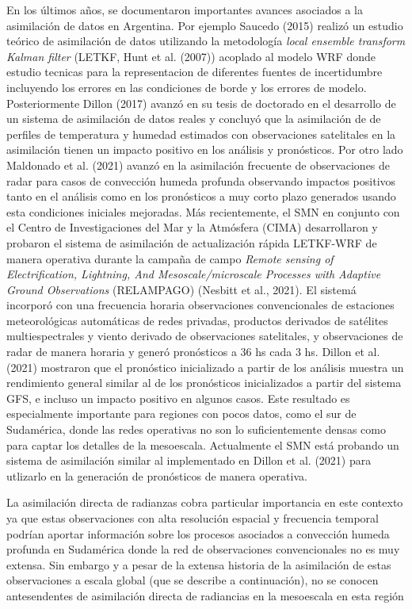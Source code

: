 \documentclass[12pt,oneside]{reedthesis}
\begin{document}
En los últimos años, se documentaron importantes avances asociados a la asimilación de datos en Argentina. Por ejemplo Saucedo (2015) realizó un estudio teórico de asimilación de datos utilizando la metodología \emph{local ensemble transform Kalman filter} (LETKF, Hunt et al. (2007)) acoplado al modelo WRF donde estudio tecnicas para la representacion de diferentes fuentes de incertidumbre incluyendo los errores en las condiciones de borde y los errores de modelo. Posteriormente Dillon (2017) avanzó en su tesis de doctorado en el desarrollo de un sistema de asimilación de datos reales y concluyó que la asimilación de de perfiles de temperatura y humedad estimados con observaciones satelitales en la asimilación tienen un impacto positivo en los análisis y pronósticos. Por otro lado Maldonado et al. (2021) avanzó en la asimilación frecuente de observaciones de radar para casos de convección humeda profunda observando impactos positivos tanto en el análisis como en los pronósticos a muy corto plazo generados usando esta condiciones iniciales mejoradas. Más recientemente, el SMN en conjunto con el Centro de Investigaciones del Mar y la Atmósfera (CIMA) desarrollaron y probaron el sistema de asimilación de actualización rápida LETKF-WRF de manera operativa durante la campaña de campo \emph{Remote sensing of Electrification, Lightning, And Mesoscale/microscale Processes with Adaptive Ground Observations} (RELAMPAGO) (Nesbitt et al., 2021). El sistemá incorporó con una frecuencia horaria observaciones convencionales de estaciones meteorológicas automáticas de redes privadas, productos derivados de satélites multiespectrales y viento derivado de observaciones satelitales, y observaciones de radar de manera horaria y generó pronósticos a 36 hs cada 3 hs. Dillon et al. (2021) mostraron que el pronóstico inicializado a partir de los análisis muestra un rendimiento general similar al de los pronósticos inicializados a partir del sistema GFS, e incluso un impacto positivo en algunos casos. Este resultado es especialmente importante para regiones con pocos datos, como el sur de Sudamérica, donde las redes operativas no son lo suficientemente densas como para captar los detalles de la mesoescala. Actualmente el SMN está probando un sistema de asimilación similar al implementado en Dillon et al. (2021) para utlizarlo en la generación de pronósticos de manera operativa.

La asimilación directa de radianzas cobra particular importancia en este contexto ya que estas observaciones con alta resolución espacial y frecuencia temporal podrían aportar información sobre los procesos asociados a convección humeda profunda en Sudamérica donde la red de observaciones convencionales no es muy extensa. Sin embargo y a pesar de la extensa historia de la asimilación de estas observaciones a escala global (que se describe a continuación), no se conocen antesendentes de asimilación directa de radiancias en la mesoescala en esta región
\end{document}
